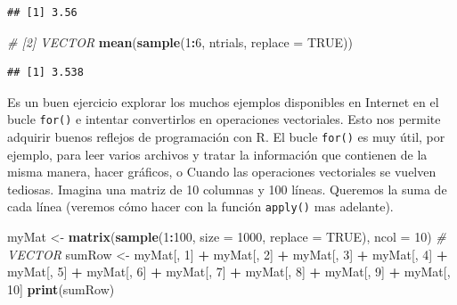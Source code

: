 \documentclass[
]{book}
\newenvironment{Shaded}{\begin{snugshade}}{\end{snugshade}}
\newcommand{\CommentTok}[1]{\textcolor[rgb]{0.56,0.35,0.01}{\textit{#1}}}
\newcommand{\DataTypeTok}[1]{\textcolor[rgb]{0.13,0.29,0.53}{#1}}
\newcommand{\DecValTok}[1]{\textcolor[rgb]{0.00,0.00,0.81}{#1}}
\newcommand{\KeywordTok}[1]{\textcolor[rgb]{0.13,0.29,0.53}{\textbf{#1}}}
\newcommand{\NormalTok}[1]{#1}
\newcommand{\OperatorTok}[1]{\textcolor[rgb]{0.81,0.36,0.00}{\textbf{#1}}}
\newcommand{\OtherTok}[1]{\textcolor[rgb]{0.56,0.35,0.01}{#1}}
\newcommand{\StringTok}[1]{\textcolor[rgb]{0.31,0.60,0.02}{#1}}
\begin{document}
\begin{verbatim}
## [1] 3.56
\end{verbatim}

\begin{Shaded}
\begin{Highlighting}[]
\CommentTok{# [2] VECTOR}
\KeywordTok{mean}\NormalTok{(}\KeywordTok{sample}\NormalTok{(}\DecValTok{1}\OperatorTok{:}\DecValTok{6}\NormalTok{, ntrials, }\DataTypeTok{replace =} \OtherTok{TRUE}\NormalTok{))}
\end{Highlighting}
\end{Shaded}

\begin{verbatim}
## [1] 3.538
\end{verbatim}

Es un buen ejercicio explorar los muchos ejemplos disponibles en Internet en el bucle \texttt{for()} e intentar convertirlos en operaciones vectoriales. Esto nos permite adquirir buenos reflejos de programación con R. El bucle \texttt{for()} es muy útil, por ejemplo, para leer varios archivos y tratar la información que contienen de la misma manera, hacer gráficos, o Cuando las operaciones vectoriales se vuelven tediosas. Imagina una matriz de 10 columnas y 100 líneas. Queremos la suma de cada línea (veremos cómo hacer con la función \texttt{apply()} mas adelante).

\begin{Shaded}
\begin{Highlighting}[]
\NormalTok{myMat <-}\StringTok{ }\KeywordTok{matrix}\NormalTok{(}\KeywordTok{sample}\NormalTok{(}\DecValTok{1}\OperatorTok{:}\DecValTok{100}\NormalTok{, }\DataTypeTok{size =} \DecValTok{1000}\NormalTok{, }\DataTypeTok{replace =} \OtherTok{TRUE}\NormalTok{), }\DataTypeTok{ncol =} \DecValTok{10}\NormalTok{)}
\CommentTok{# VECTOR}
\NormalTok{sumRow <-}\StringTok{ }\NormalTok{myMat[, }\DecValTok{1}\NormalTok{] }\OperatorTok{+}\StringTok{ }\NormalTok{myMat[, }\DecValTok{2}\NormalTok{] }\OperatorTok{+}\StringTok{ }\NormalTok{myMat[, }\DecValTok{3}\NormalTok{] }\OperatorTok{+}\StringTok{ }\NormalTok{myMat[, }\DecValTok{4}\NormalTok{] }\OperatorTok{+}\StringTok{ }
\StringTok{  }\NormalTok{myMat[, }\DecValTok{5}\NormalTok{] }\OperatorTok{+}\StringTok{ }\NormalTok{myMat[, }\DecValTok{6}\NormalTok{] }\OperatorTok{+}\StringTok{ }\NormalTok{myMat[, }\DecValTok{7}\NormalTok{] }\OperatorTok{+}\StringTok{ }\NormalTok{myMat[, }\DecValTok{8}\NormalTok{] }\OperatorTok{+}\StringTok{ }
\StringTok{  }\NormalTok{myMat[, }\DecValTok{9}\NormalTok{] }\OperatorTok{+}\StringTok{ }\NormalTok{myMat[, }\DecValTok{10}\NormalTok{]}
\KeywordTok{print}\NormalTok{(sumRow)}
\end{Highlighting}
\end{Shaded}
\end{document}
